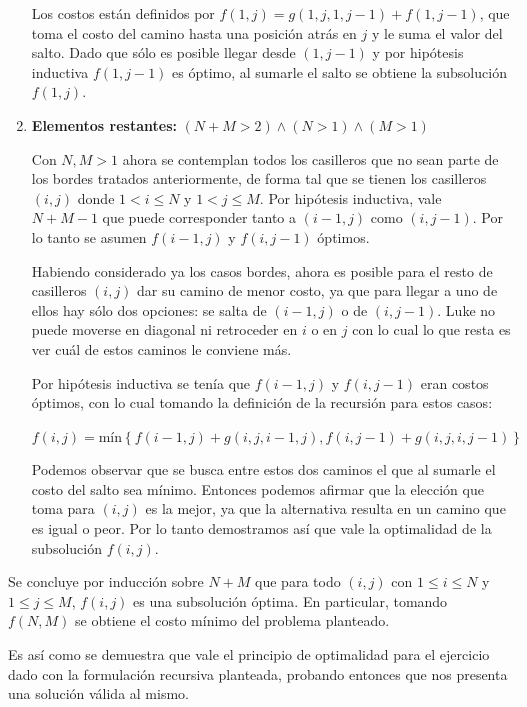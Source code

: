 \begin{enumerate}
{			Los costos están definidos por $f(1, j) = g(1, j, 1, j - 1) + f(1, j
			- 1)$, que toma el costo del camino hasta una posición atrás en $j$
			y le suma el valor del salto. Dado que sólo es posible llegar desde
			$(1, j - 1)$ y por hipótesis inductiva $f(1, j - 1)$ es óptimo, al
			sumarle el salto se obtiene la subsolución $f(1, j)$.
		}
		\item{
			\textbf{Elementos restantes: } $(N + M > 2) \land (N > 1) \land (M > 1)$

			Con $N, M > 1$ ahora se contemplan todos los casilleros que no sean
			parte de los bordes tratados anteriormente, de forma tal que se tienen los
			casilleros $(i, j)$ donde $1 < i \leq N$ y $1 < j \leq M$. Por
			hipótesis inductiva, vale $N + M - 1$ que puede corresponder tanto a $(i -
			1, j)$ como $(i, j - 1)$. Por lo tanto se asumen $f(i - 1, j)$ y $f(i, j - 1)$
			óptimos.

			Habiendo considerado ya los casos bordes, ahora es posible para el
			resto de casilleros $(i, j)$ dar su camino de menor costo, ya que
			para llegar a uno de ellos hay sólo dos opciones: se salta de $(i -
			1, j)$ o de $(i, j - 1)$. Luke no puede moverse en diagonal ni
			retroceder en $i$ o en $j$ con lo cual lo que resta es ver cuál de
			estos caminos le conviene más.

			Por hipótesis inductiva se tenía que $f(i - 1, j)$ y $f(i, j - 1)$
			eran costos óptimos, con lo cual tomando la definición de la
			recursión para estos casos:

			$f(i, j) = \text{mín}\left \{ f(i - 1, j) + g(i, j, i - 1, j), f(i, j - 1) + g(i, j, i, j - 1) \right \}$

			Podemos observar que se busca entre estos dos caminos el que al
			sumarle el costo del salto sea mínimo. Entonces podemos afirmar que
			la elección que toma para $(i, j)$ es la mejor, ya que la
			alternativa resulta en un camino que es igual o peor. Por lo tanto
			demostramos así que vale la optimalidad de la subsolución $f(i, j)$.

		}
	\end{enumerate}

	Se concluye por inducción sobre $N + M$ que para todo $(i, j)$ con $1 \leq
	i \leq N$ y $1 \leq j \leq M$, $f(i, j)$ es una subsolución óptima. En
	particular, tomando $f(N, M)$ se obtiene el costo mínimo del problema
	planteado.

	Es así como se demuestra que vale el principio de optimalidad para el
	ejercicio dado con la formulación recursiva planteada, probando entonces que
	nos presenta una solución válida al mismo.

